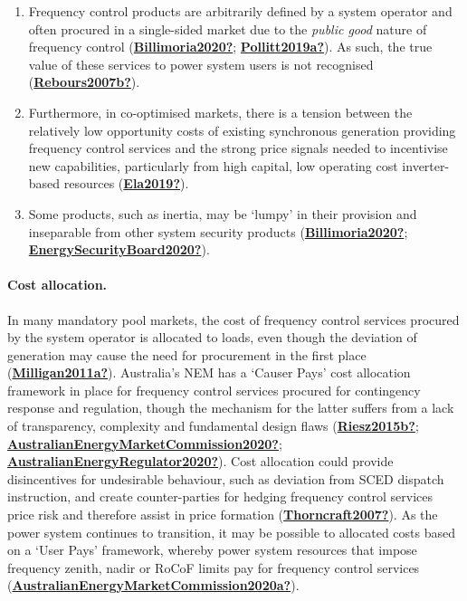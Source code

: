 \documentclass[12pt,a4paper,]{report}
\begin{document}
\begin{enumerate}
\def\labelenumi{\arabic{enumi}.}
\item
  Frequency control products are arbitrarily defined by a system
  operator and often procured in a single-sided market due to the
  \emph{public good} nature of frequency control
  (\protect\hyperlink{ref-Billimoria2020}{\textbf{Billimoria2020?}};
  \protect\hyperlink{ref-Pollitt2019a}{\textbf{Pollitt2019a?}}). As
  such, the true value of these services to power system users is not
  recognised
  (\protect\hyperlink{ref-Rebours2007b}{\textbf{Rebours2007b?}}).
\item
  Furthermore, in co-optimised markets, there is a tension between the
  relatively low opportunity costs of existing synchronous generation
  providing frequency control services and the strong price signals
  needed to incentivise new capabilities, particularly from high
  capital, low operating cost inverter-based resources
  (\protect\hyperlink{ref-Ela2019}{\textbf{Ela2019?}}).
\item
  Some products, such as inertia, may be `lumpy' in their provision and
  inseparable from other system security products
  (\protect\hyperlink{ref-Billimoria2020}{\textbf{Billimoria2020?}};
  \protect\hyperlink{ref-EnergySecurityBoard2020}{\textbf{EnergySecurityBoard2020?}}).
\end{enumerate}

\hypertarget{cost-allocation.}{%
\paragraph{Cost allocation.}\label{cost-allocation.}}

In many mandatory pool markets, the cost of frequency control services
procured by the system operator is allocated to loads, even though the
deviation of generation may cause the need for procurement in the first
place (\protect\hyperlink{ref-Milligan2011a}{\textbf{Milligan2011a?}}).
Australia's NEM has a `Causer Pays' cost allocation framework in place
for frequency control services procured for contingency response and
regulation, though the mechanism for the latter suffers from a lack of
transparency, complexity and fundamental design flaws
(\protect\hyperlink{ref-Riesz2015b}{\textbf{Riesz2015b?}};
\protect\hyperlink{ref-AustralianEnergyMarketCommission2020}{\textbf{AustralianEnergyMarketCommission2020?}};
\protect\hyperlink{ref-AustralianEnergyRegulator2020}{\textbf{AustralianEnergyRegulator2020?}}).
Cost allocation could provide disincentives for undesirable behaviour,
such as deviation from SCED dispatch instruction, and create
counter-parties for hedging frequency control services price risk and
therefore assist in price formation
(\protect\hyperlink{ref-Thorncraft2007}{\textbf{Thorncraft2007?}}). As
the power system continues to transition, it may be possible to
allocated costs based on a `User Pays' framework, whereby power system
resources that impose frequency zenith, nadir or RoCoF limits pay for
frequency control services
(\protect\hyperlink{ref-AustralianEnergyMarketCommission2020a}{\textbf{AustralianEnergyMarketCommission2020a?}}).
\end{document}
